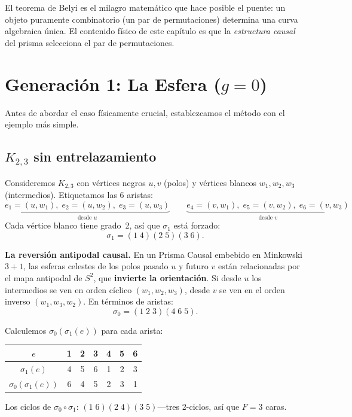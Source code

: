 \documentclass[11pt, a4paper, openany]{book}
\begin{document}
\noindent
El teorema de Belyi es el milagro matemático que hace posible el puente:
un objeto puramente combinatorio (un par de permutaciones) determina una
curva algebraica única. El contenido físico de este capítulo es que la
\emph{estructura causal} del prisma selecciona el par de permutaciones.

\section{Generación 1: La Esfera ($g = 0$)}
\label{sec:gen1-esfera}

Antes de abordar el caso físicamente crucial, establezcamos el método
con el ejemplo más simple.

\subsection{$K_{2,3}$ sin entrelazamiento}

Consideremos $K_{2,3}$ con vértices negros $u, v$ (polos) y vértices
blancos $w_1, w_2, w_3$ (intermedios). Etiquetamos las 6 aristas:
\[
  \underbrace{e_1 = (u,w_1),\; e_2 = (u,w_2),\; e_3 = (u,w_3)}_{\text{desde } u}
  \qquad
  \underbrace{e_4 = (v,w_1),\; e_5 = (v,w_2),\; e_6 = (v,w_3)}_{\text{desde } v}
\]
Cada vértice blanco tiene grado~2, así que $\sigma_1$ está forzado:
\[
  \sigma_1 = (1\;4)(2\;5)(3\;6).
\]

\noindent\textbf{La reversión antipodal causal.} En un Prisma Causal
embebido en Minkowski $3{+}1$, las esferas celestes de los polos pasado
$u$ y futuro $v$ están relacionadas por el mapa antipodal de $S^2$,
que \textbf{invierte la orientación}. Si desde $u$ los intermedios se
ven en orden cíclico $(w_1, w_2, w_3)$, desde $v$ se ven en el orden
inverso $(w_1, w_3, w_2)$. En términos de aristas:
\[
  \sigma_0 = (1\;2\;3)(4\;6\;5).
\]

\noindent
Calculemos $\sigma_0(\sigma_1(e))$ para cada arista:
\begin{center}
\renewcommand{\arraystretch}{1.15}
\begin{tabular}{c@{\;\;}c@{\;\;}c@{\;\;}c@{\;\;}c@{\;\;}c@{\;\;}c}
\toprule
$e$ & 1 & 2 & 3 & 4 & 5 & 6 \\
\midrule
$\sigma_1(e)$ & 4 & 5 & 6 & 1 & 2 & 3 \\
$\sigma_0(\sigma_1(e))$ & 6 & 4 & 5 & 2 & 3 & 1 \\
\bottomrule
\end{tabular}
\end{center}
Los ciclos de $\sigma_0 \circ \sigma_1$: $(1\;6)(2\;4)(3\;5)$---tres
2-ciclos, así que $F = 3$ caras.
\end{document}
